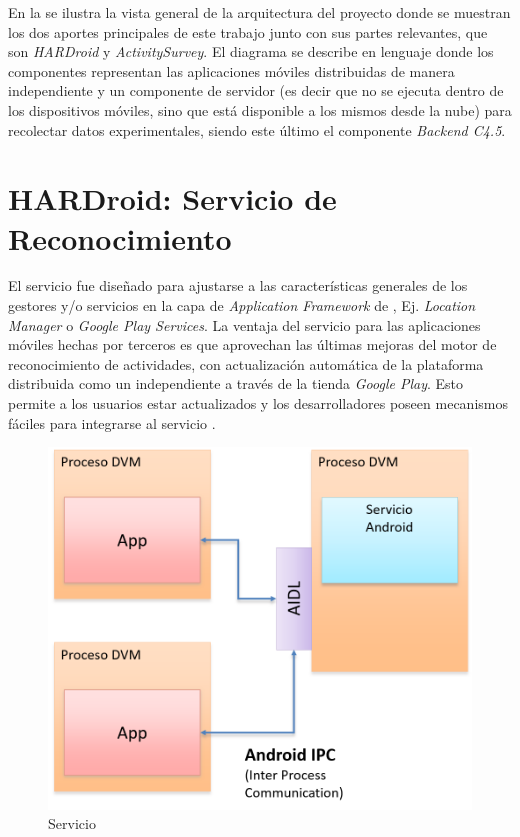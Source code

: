 En la  se ilustra la vista general de
la arquitectura del proyecto donde se muestran los dos aportes principales
de este trabajo junto con sus partes relevantes, que son \emph{HARDroid}
y \emph{ActivitySurvey}. El diagrama se describe en lenguaje 
donde los componentes representan las aplicaciones móviles distribuidas
de manera independiente y un componente de servidor (es decir que
no se ejecuta dentro de los dispositivos móviles, sino que está disponible
a los mismos desde la nube) para recolectar datos experimentales,
siendo este último el componente \emph{Backend C4.5}.

\section{HARDroid: Servicio de Reconocimiento}

\label{sec54:hardroid}El servicio \emph{ }fue diseñado
para ajustarse a las características generales de los gestores y/o
servicios en la capa de \emph{Application Framework} de \emph{},
Ej. \emph{Location Manager} o \emph{Google Play Services}. La ventaja
del servicio \emph{} para las aplicaciones móviles
hechas por terceros es que aprovechan las últimas mejoras del motor
de reconocimiento de actividades, con actualización automática de
la plataforma distribuida como un  independiente a través
de la tienda \emph{Google Play}. Esto permite a los usuarios estar
actualizados y los desarrolladores poseen mecanismos fáciles para
integrarse al servicio .

\begin{figure}[H]
\begin{centering}
\includegraphics[width=0.7\columnwidth]{capitulo-5/graphics/hardroid_func}
\par\end{centering}
\caption[Servicio HARDroid]{\label{fig5:hardroid-func}Servicio }

\end{figure}

